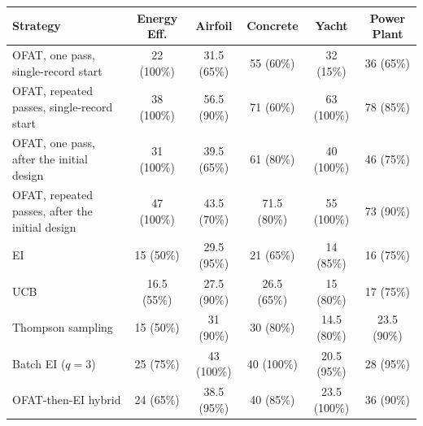 \footnotesize\setlength{\tabcolsep}{2pt}%
\begin{tabular}{@{}lccccc@{}}
\toprule
Strategy & Energy Eff. & Airfoil & Concrete & Yacht & Power Plant \\
\midrule
OFAT, one pass, single-record start & 22 (100\%) & 31.5 (65\%) & 55 (60\%) & 32 (15\%) & 36 (65\%) \\
OFAT, repeated passes, single-record start & 38 (100\%) & 56.5 (90\%) & 71 (60\%) & 63 (100\%) & 78 (85\%) \\
OFAT, one pass, after the initial design & 31 (100\%) & 39.5 (65\%) & 61 (80\%) & 40 (100\%) & 46 (75\%) \\
OFAT, repeated passes, after the initial design & 47 (100\%) & 43.5 (70\%) & 71.5 (80\%) & 55 (100\%) & 73 (90\%) \\
EI & 15 (50\%) & 29.5 (95\%) & 21 (65\%) & 14 (85\%) & 16 (75\%) \\
UCB & 16.5 (55\%) & 27.5 (90\%) & 26.5 (65\%) & 15 (80\%) & 17 (75\%) \\
Thompson sampling & 15 (50\%) & 31 (90\%) & 30 (80\%) & 14.5 (80\%) & 23.5 (90\%) \\
Batch EI ($q=3$) & 25 (75\%) & 43 (100\%) & 40 (100\%) & 20.5 (95\%) & 28 (95\%) \\
OFAT-then-EI hybrid & 24 (65\%) & 38.5 (95\%) & 40 (85\%) & 23.5 (100\%) & 36 (90\%) \\
\bottomrule
\end{tabular}
